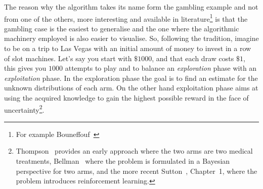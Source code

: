 \documentclass[]{scrartcl}
\theoremstyle{definition}
\begin{document}
The reason why the algorithm takes its name form the gambling example and not from one of the others, more interesting and available in literature\footnote{
    For example Bouneffouf~\cite{bf2019survey}
    }
is that the gambling case is the easiest to generalise and the one where the algorithmic machinery employed is also easier to visualise.
So, following the tradition, imagine to be on a trip to Las Vegas with an initial amount of money to invest in a row of slot machines. Let's say you start with $\$1000$, and that each draw costs $\$1$, this gives you $1000$ attempts to play and to balance an \emph{exploration} phase with an \emph{exploitation} phase. In the exploration phase the goal is to find an estimate for the unknown distributions of each arm. On the other hand exploitation phase aims at using the acquired knowledge to gain the highest possible reward in the face of uncertainty\footnote{
    Thompson~\cite{thompson1933likelihood} provides an early approach where the two arms are two medical treatments, Bellman~\cite{bellman1956problem} where the problem is formulated in a Bayesian perspective for two arms, and the more recent Sutton~\cite{sutton2018reinforcement}, Chapter~1, where the problem introduces reinforcement learning.
}.
\end{document}
